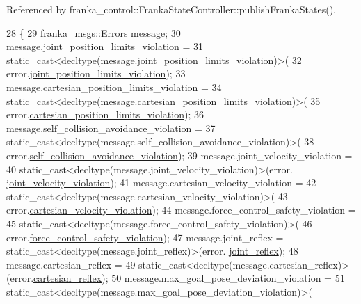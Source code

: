 Referenced by franka\+\_\+control\+::\+Franka\+State\+Controller\+::publish\+Franka\+States().


\begin{DoxyCode}
28                                                              \{
29   franka\_msgs::Errors message;
30   message.joint\_position\_limits\_violation =
31       \textcolor{keyword}{static\_cast<}decltype(message.joint\_position\_limits\_violation)\textcolor{keyword}{>}(
32           error.\hyperlink{structfranka_1_1Errors_a44ba0d45e52639280d32cf447f967e29}{joint\_position\_limits\_violation});
33   message.cartesian\_position\_limits\_violation =
34       \textcolor{keyword}{static\_cast<}decltype(message.cartesian\_position\_limits\_violation)\textcolor{keyword}{>}(
35           error.\hyperlink{structfranka_1_1Errors_a41c8b50ecbb015a2dba1a3dbbff694b6}{cartesian\_position\_limits\_violation});
36   message.self\_collision\_avoidance\_violation =
37       \textcolor{keyword}{static\_cast<}decltype(message.self\_collision\_avoidance\_violation)\textcolor{keyword}{>}(
38           error.\hyperlink{structfranka_1_1Errors_adf68f6333624cb5558864441a991de8c}{self\_collision\_avoidance\_violation});
39   message.joint\_velocity\_violation =
40       \textcolor{keyword}{static\_cast<}decltype(message.joint\_velocity\_violation)\textcolor{keyword}{>}(error.
      \hyperlink{structfranka_1_1Errors_a803ac4acbc26350602ea2eb02b7b30c4}{joint\_velocity\_violation});
41   message.cartesian\_velocity\_violation =
42       \textcolor{keyword}{static\_cast<}decltype(message.cartesian\_velocity\_violation)\textcolor{keyword}{>}(
43           error.\hyperlink{structfranka_1_1Errors_a382fbec6b463ddcc2cbfd90340021ff1}{cartesian\_velocity\_violation});
44   message.force\_control\_safety\_violation =
45       \textcolor{keyword}{static\_cast<}decltype(message.force\_control\_safety\_violation)\textcolor{keyword}{>}(
46           error.\hyperlink{structfranka_1_1Errors_ae7b19674da28b11ba970c30c7d800923}{force\_control\_safety\_violation});
47   message.joint\_reflex = \textcolor{keyword}{static\_cast<}decltype(message.joint\_reflex)\textcolor{keyword}{>}(error.
      \hyperlink{structfranka_1_1Errors_afb0928680c586e73d4e2cd4b42c7fe48}{joint\_reflex});
48   message.cartesian\_reflex =
49       \textcolor{keyword}{static\_cast<}decltype(message.cartesian\_reflex)\textcolor{keyword}{>}(error.\hyperlink{structfranka_1_1Errors_a47bd58b0ab2198e4d038e0a24eafb310}{cartesian\_reflex});
50   message.max\_goal\_pose\_deviation\_violation =
51       \textcolor{keyword}{static\_cast<}decltype(message.max\_goal\_pose\_deviation\_violation)\textcolor{keyword}{>}(

\end{DoxyCode}
